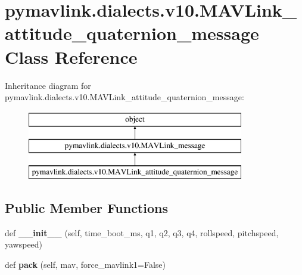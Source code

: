 \hypertarget{classpymavlink_1_1dialects_1_1v10_1_1MAVLink__attitude__quaternion__message}{}\section{pymavlink.\+dialects.\+v10.\+M\+A\+V\+Link\+\_\+attitude\+\_\+quaternion\+\_\+message Class Reference}
\label{classpymavlink_1_1dialects_1_1v10_1_1MAVLink__attitude__quaternion__message}
Inheritance diagram for pymavlink.\+dialects.\+v10.\+M\+A\+V\+Link\+\_\+attitude\+\_\+quaternion\+\_\+message\+:\begin{figure}[H]
\begin{center}
\leavevmode
\includegraphics[height=3.000000cm]{classpymavlink_1_1dialects_1_1v10_1_1MAVLink__attitude__quaternion__message}
\end{center}
\end{figure}
\subsection*{Public Member Functions}
\begin{DoxyCompactItemize}
\item 
\mbox{\label{classpymavlink_1_1dialects_1_1v10_1_1MAVLink__attitude__quaternion__message_a79597d5adeea4b551cb15064e773800d}} 
def {\bfseries \+\_\+\+\_\+init\+\_\+\+\_\+} (self, time\+\_\+boot\+\_\+ms, q1, q2, q3, q4, rollspeed, pitchspeed, yawspeed)
\item 
\mbox{\label{classpymavlink_1_1dialects_1_1v10_1_1MAVLink__attitude__quaternion__message_a0c8d758a4e1a5650a5d5c921b561874a}} 
def {\bfseries pack} (self, mav, force\+\_\+mavlink1=False)
\end{DoxyCompactItemize}
